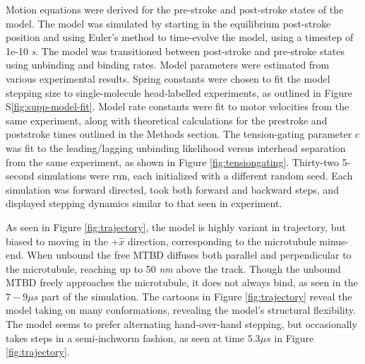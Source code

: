 \documentclass[9pt,twocolumn,twoside]{article}
\begin{document}
Motion equations were derived for the pre-stroke and post-stroke states of the model. The model was simulated by starting in the equilibrium post-stroke position and using Euler's method to time-evolve the model, using a timestep of 1e-10 \textit{s}. The model was transitioned between post-stroke and pre-stroke states using unbinding and binding rates. Model parameters were estimated from various experimental results. Spring constants were chosen to fit the model stepping size to single-molecule head-labelled experiments\cite{yildizpaper}, as outlined in Figure S\ref{fig:supp-model-fit}. Model rate constants were fit to motor velocities from the same experiment, along with theoretical calculations for the prestroke and poststroke times outlined in the Methods section. The tension-gating parameter $c$ was fit to the leading/lagging unbinding likelihood versus interhead separation from the same experiment, as shown in Figure \ref{fig:tensiongating}. Thirty-two 5-second simulations were run, each initialized with a different random seed. Each simulation was forward directed, took both forward and backward steps, and displayed stepping dynamics similar to that seen in experiment.

As seen in Figure \ref{fig:trajectory}, the model is highly variant in trajectory, but biased to moving in the $+\hat{x}$ direction, corresponding to the microtubule minus-end. When unbound the free MTBD diffuses both parallel and perpendicular to the microtubule, reaching up to 50 \textit{nm} above the track. Though the unbound MTBD freely approaches the microtubule, it does not always bind, as seen in the $7-9 \mu s$ part of the simulation. The cartoons in Figure \ref{fig:trajectory} reveal the model taking on many conformations, revealing the model's structural flexibility. The model seems to prefer alternating hand-over-hand stepping, but occasionally takes steps in a semi-inchworm fashion, as seen at time $5.3 \mu s$ in Figure \ref{fig:trajectory}.
\end{document}
